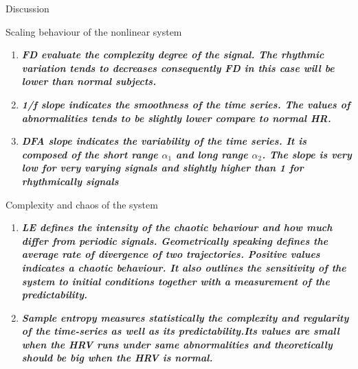 \documentclass[t,12pt,english
\ifx\beamermode\undefined\else,\beamermode\fi
]{beamer}
\begin{document}
\begin{frame}{Discussion}


\begin{block}{\footnotesize{Scaling behaviour of the nonlinear system}}\tiny{}
\begin{enumerate} 
\vspace{0.05cm}
     \item \tiny{\textbf{\textit{FD evaluate the complexity degree of the signal. The rhythmic variation tends to decreases consequently FD in this case will be lower than normal subjects.}}}
     \item \tiny{\textbf{\textit{1/f slope indicates the smoothness of the time series. The values of abnormalities tends to be slightly lower compare to normal HR.}}} 
     \item \tiny{\textbf{\textit{DFA slope indicates the variability of the time series. It is composed of the short range $\alpha_{1}$ and long range $\alpha_{2}$. The slope is very low for very varying signals and slightly higher than 1 for rhythmically signals}}}
\end{enumerate}
\end{block}

\begin{block}{\footnotesize{Complexity and chaos of the system}}\tiny{}
\begin{enumerate} 
\vspace{0.05cm}
     \item \tiny{\textbf{\textit{LE defines the intensity of the chaotic behaviour and how much differ from periodic signals. Geometrically speaking defines the average rate of divergence of two trajectories. Positive values indicates a chaotic behaviour. It also outlines the sensitivity of the system to initial conditions together with a measurement of the predictability.}}}
     \item \tiny{\textbf{\textit{Sample entropy measures statistically the complexity and regularity of the time-series as well as its predictability.Its values are small when the HRV runs under same abnormalities and theoretically should be big when the HRV is normal.}}}

\end{enumerate}
\end{block}

\end{frame}
\end{document}
